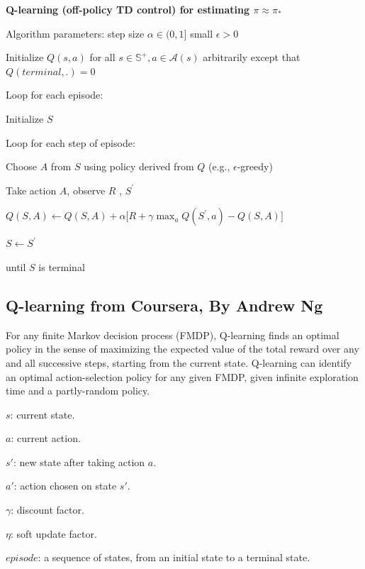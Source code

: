 \documentclass{article}
\begin{document}
\textbf{Q-learning (off-policy TD control) for estimating $\pi \approx \pi_*$}

Algorithm parameters: step size $\alpha \in ( 0 , 1 ]$ small $\epsilon > 0$

Initialize $Q ( s , a )$ for all $s \in \mathbb { S } ^ { + } , a \in \mathcal { A } ( s )$ arbitrarily except that $Q ( terminal , . ) = 0$

Loop for each episode:

\hspace{.5cm} Initialize $S$

\hspace{.5cm} Loop for each step of episode:

\hspace{1cm} Choose $A$ from $S$ using policy derived from $Q$ (e.g.,   $\epsilon$-greedy)

\hspace{1cm} Take action $A$, observe $R$ ,   $S ^ { \prime }$

\hspace{1cm} $Q ( S , A ) \leftarrow Q ( S , A ) + \alpha \big [ R + \gamma \operatorname* { m a x } _ { a } Q ( S ^ { \prime } , a ) - Q ( S , A ) \big ]$

\hspace{1cm} $S \leftarrow S ^ { \prime }$

\hspace{.5cm} until $S$ is terminal

\subsection{Q-learning from Coursera, By Andrew Ng}

For any finite Markov decision process (FMDP), Q-learning finds an optimal policy in the sense of maximizing the expected value of the total reward over any and all successive steps, starting from the current state. Q-learning can identify an optimal action-selection policy for any given FMDP, given infinite exploration time and a partly-random policy.

\(s\): current state.

\(a\): current action.

\(s'\): new state after taking action \(a\).

\(a'\): action chosen on state \(s'\).

\(\gamma\): discount factor.

\(\eta\): soft update factor.

\(episode\): a sequence of states, from an initial state to a terminal state.
\end{document}
